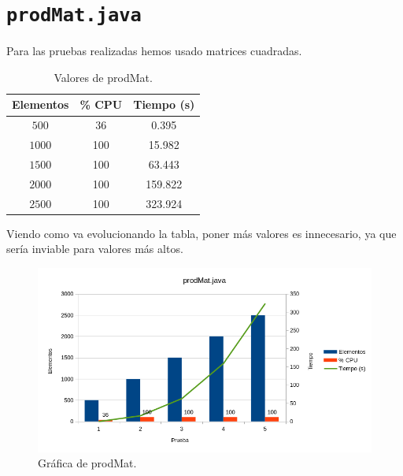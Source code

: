 \documentclass[12pt,letterpaper]{article}
\begin{document}
\newpage
\section{\texttt{prodMat.java}}

Para las pruebas realizadas hemos usado matrices cuadradas.
\begin{center}
	\begin{table}[htbp]
		\begin{center}
			\begin{tabular}{|c|c|c|}
				\hline
				\textbf{Elementos} & \textbf{\% CPU} & \textbf{Tiempo (s)}  \\
				\hline 
				$500$ & 36 & 0.395\\ \hline	
				$1000$ & 100 & 15.982\\ \hline
				$1500$ & 100 & 63.443\\ \hline
				$2000$ & 100 & 159.822\\ \hline
				$2500$ & 100 & 323.924\\ \hline
			\end{tabular}
			\caption{Valores de prodMat.}
			\label{tabla:Valores de prodMat}
		\end{center}
	\end{table}
\end{center}

Viendo como va evolucionando la tabla, poner más valores es innecesario, ya que sería inviable para valores más altos.

\begin{figure}[h]
	\begin{center}
		\includegraphics[scale=0.8]{prodMat.png}
		\caption{Gráfica de prodMat.}
		\label{fig: prodMat}
	\end{center}	
\end{figure}
\end{document}
